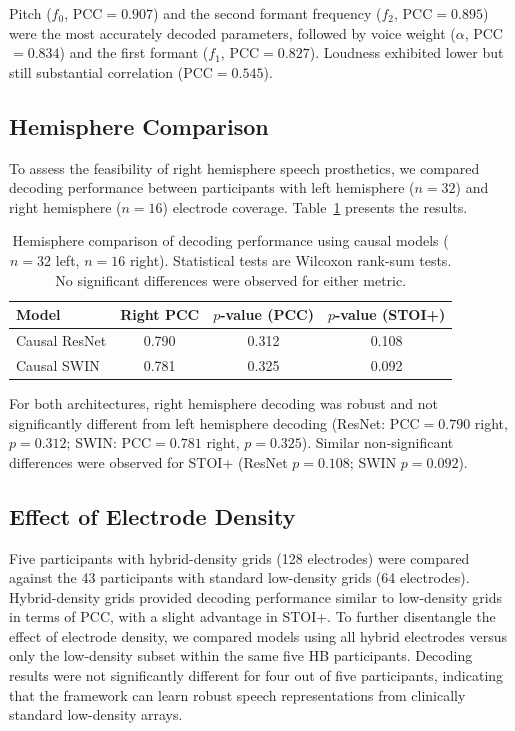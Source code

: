 \documentclass[11pt]{article}
\begin{document}
Pitch ($f_0$, PCC${}=0.907$) and the second formant frequency ($f_2$, PCC${}=0.895$) were the most accurately decoded parameters, followed by voice weight ($\alpha$, PCC${}=0.834$) and the first formant ($f_1$, PCC${}=0.827$). Loudness exhibited lower but still substantial correlation (PCC${}=0.545$).

\subsection{Hemisphere Comparison}

To assess the feasibility of right hemisphere speech prosthetics, we compared decoding performance between participants with left hemisphere ($n=32$) and right hemisphere ($n=16$) electrode coverage. Table~\ref{tab:hemisphere} presents the results.

\begin{table}[H]
\centering
\caption{Hemisphere comparison of decoding performance using causal models ($n=32$ left, $n=16$ right). Statistical tests are Wilcoxon rank-sum tests. No significant differences were observed for either metric.}
\label{tab:hemisphere}
\begin{tabular}{lccc}
\toprule
\textbf{Model} & \textbf{Right PCC} & \textbf{$p$-value (PCC)} & \textbf{$p$-value (STOI+)} \\
\midrule
Causal ResNet & 0.790 & 0.312 & 0.108 \\
Causal SWIN   & 0.781 & 0.325 & 0.092 \\
\bottomrule
\end{tabular}
\end{table}

For both architectures, right hemisphere decoding was robust and not significantly different from left hemisphere decoding (ResNet: PCC${}=0.790$ right, $p=0.312$; SWIN: PCC${}=0.781$ right, $p=0.325$). Similar non-significant differences were observed for STOI+ (ResNet $p=0.108$; SWIN $p=0.092$).

\subsection{Effect of Electrode Density}

Five participants with hybrid-density grids (128 electrodes) were compared against the 43 participants with standard low-density grids (64 electrodes). Hybrid-density grids provided decoding performance similar to low-density grids in terms of PCC, with a slight advantage in STOI+. To further disentangle the effect of electrode density, we compared models using all hybrid electrodes versus only the low-density subset within the same five HB participants. Decoding results were not significantly different for four out of five participants, indicating that the framework can learn robust speech representations from clinically standard low-density arrays.
\end{document}
